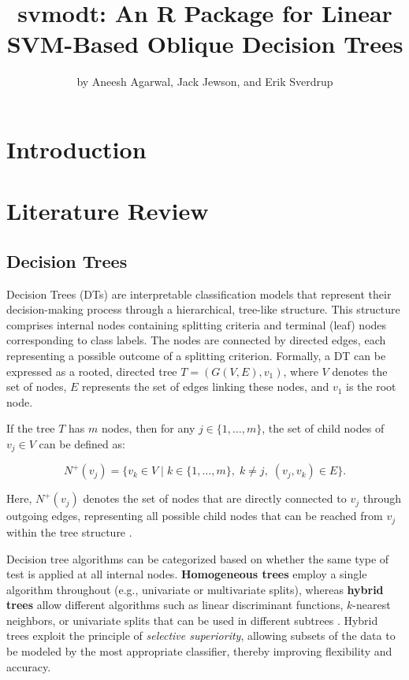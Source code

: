 \title{svmodt: An R Package for Linear SVM-Based Oblique Decision Trees}


\author{by Aneesh Agarwal, Jack Jewson, and Erik Sverdrup}

\maketitle


\section{Introduction}\label{introduction}

\section{Literature Review}\label{literature-review}

\subsection{Decision Trees}\label{decision-trees}

Decision Trees (DTs) are interpretable classification models that represent their decision-making process through a hierarchical, tree-like structure. This structure comprises internal nodes containing splitting criteria and terminal (leaf) nodes corresponding to class labels. The nodes are connected by directed edges, each representing a possible outcome of a splitting criterion. Formally, a DT can be expressed as a rooted, directed tree \(T = (G(V, E), v_1)\), where \(V\) denotes the set of nodes, \(E\) represents the set of edges linking these nodes, and \(v_1\) is the root node.

If the tree \(T\) has \(m\) nodes, then for any \(j \in \{1, \ldots, m\}\), the set of child nodes of \(v_j \in V\) can be defined as:

\[
N^{+}(v_j) = \{ v_k \in V \mid k \in \{1, \ldots, m\},\; k \neq j,\; (v_j, v_k) \in E \}.
\]

Here, \(N^{+}(v_j)\) denotes the set of nodes that are directly connected to \(v_j\) through outgoing edges, representing all possible child nodes that can be reached from \(v_j\) within the tree structure \citep{lopez2018}.

Decision tree algorithms can be categorized based on whether the same type of test is applied at all internal nodes. \textbf{Homogeneous trees} employ a single algorithm throughout (e.g., univariate or multivariate splits), whereas \textbf{hybrid trees} allow different algorithms such as linear discriminant functions, \(k\)-nearest neighbors, or univariate splits that can be used in different subtrees \citep{brodley1995}. Hybrid trees exploit the principle of \emph{selective superiority}, allowing subsets of the data to be modeled by the most appropriate classifier, thereby improving flexibility and accuracy.

